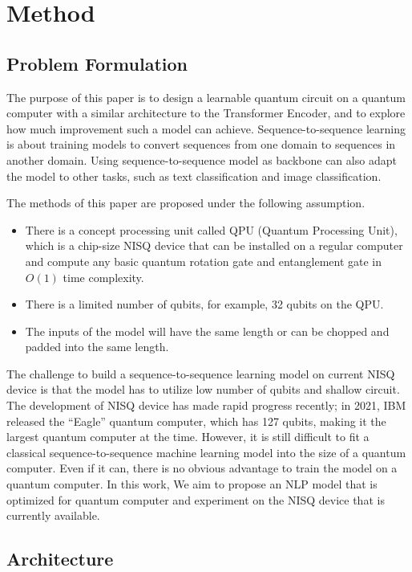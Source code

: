 \section{Method}

\subsection{Problem Formulation}

The purpose of this paper is to design a learnable quantum circuit on a quantum computer with a similar architecture to the Transformer Encoder, and to explore how much improvement such a model can achieve.
Sequence-to-sequence learning is about training models to convert sequences from one domain to sequences in another domain. Using sequence-to-sequence model as backbone can also adapt the model to other tasks, such as text classification and image classification.

The methods of this paper are proposed under the following assumption.
\begin{itemize}
  \item There is a concept processing unit called QPU (Quantum Processing Unit), which is a chip-size NISQ device that can be installed on a regular computer and compute any basic quantum rotation gate and entanglement gate in $O(1)$ time complexity.
  \item There is a limited number of qubits, for example, 32 qubits on the QPU.
  \item The inputs of the model will have the same length or can be chopped and padded into the same length.
\end{itemize}

The challenge to build a sequence-to-sequence learning model on current NISQ device is that the model has to utilize low number of qubits and shallow circuit. The development of NISQ device has made rapid progress recently; in 2021, IBM released the “Eagle” quantum computer, which has 127 qubits, making it the largest quantum computer at the time. However, it is still difficult to fit a classical sequence-to-sequence machine learning model into the size of a quantum computer. Even if it can, there is no obvious advantage to train the model on a quantum computer. In this work, We aim to propose an NLP model that is optimized for quantum computer and experiment on the NISQ device that is currently available.

\subsection{Architecture}

